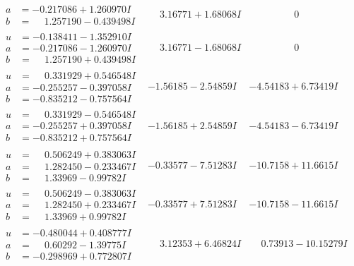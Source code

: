 \documentclass[1p]{elsarticle_modified}
\theoremstyle{definition}
\begin{document}
$$\begin{array}{c|c|c}
\begin{aligned}
a &= -0.217086 + 1.260970 I \\
b &= \phantom{-}1.257190 - 0.439498 I\end{aligned}
 & \phantom{-}3.16771 + 1.68068 I & \phantom{-0.000000 } 0 \\ \hline\begin{aligned}
u &= -0.138411 - 1.352910 I \\
a &= -0.217086 - 1.260970 I \\
b &= \phantom{-}1.257190 + 0.439498 I\end{aligned}
 & \phantom{-}3.16771 - 1.68068 I & \phantom{-0.000000 } 0 \\ \hline\begin{aligned}
u &= \phantom{-}0.331929 + 0.546548 I \\
a &= -0.255257 - 0.397058 I \\
b &= -0.835212 - 0.757564 I\end{aligned}
 & -1.56185 - 2.54859 I & -4.54183 + 6.73419 I \\ \hline\begin{aligned}
u &= \phantom{-}0.331929 - 0.546548 I \\
a &= -0.255257 + 0.397058 I \\
b &= -0.835212 + 0.757564 I\end{aligned}
 & -1.56185 + 2.54859 I & -4.54183 - 6.73419 I \\ \hline\begin{aligned}
u &= \phantom{-}0.506249 + 0.383063 I \\
a &= \phantom{-}1.282450 - 0.233467 I \\
b &= \phantom{-}1.33969 - 0.99782 I\end{aligned}
 & -0.33577 - 7.51283 I & -10.7158 + 11.6615 I \\ \hline\begin{aligned}
u &= \phantom{-}0.506249 - 0.383063 I \\
a &= \phantom{-}1.282450 + 0.233467 I \\
b &= \phantom{-}1.33969 + 0.99782 I\end{aligned}
 & -0.33577 + 7.51283 I & -10.7158 - 11.6615 I \\ \hline\begin{aligned}
u &= -0.480044 + 0.408777 I \\
a &= \phantom{-}0.60292 - 1.39775 I \\
b &= -0.298969 + 0.772807 I\end{aligned}
 & \phantom{-}3.12353 + 6.46824 I & \phantom{-}0.73913 - 10.15279 I \\ \hline\begin{aligned}

\end{aligned}
\end{array}$$
\end{document}
